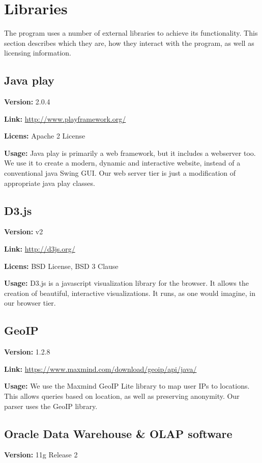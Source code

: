 \section{Libraries}

The program uses a number of external libraries to achieve its functionality. This section describes which they are,
how they interact with the program, as well as licensing information. 

\subsection{Java play}
\textbf{Version:} 2.0.4

\textbf{Link:} \url{http://www.playframework.org/}

\textbf{Licens:} Apache 2 License

\textbf{Usage:} 
Java play is primarily a web framework, but it includes a webserver too.
We use it to create a modern, dynamic and interactive website, instead of a conventional java Swing GUI.
Our web server tier is just a modification of appropriate java play classes.

\subsection{D3.js}
\textbf{Version:} v2

\textbf{Link:} \url{http://d3js.org/} 

\textbf{Licens:} BSD License, BSD 3 Clause


\textbf{Usage:} 
D3.js is a javascript visualization library for the browser.
It allows the creation of beautiful, interactive visualizations.
It runs, as one would imagine, in our browser tier.


\subsection{GeoIP}\label{geo}

\textbf{Version:} 1.2.8

\textbf{Link:} \url{https://www.maxmind.com/download/geoip/api/java/}

\textbf{Usage:} 
We use the Maxmind GeoIP Lite library to map user IPs to locations.
This allows queries based on location, as well as preserving anonymity.
Our parser uses the GeoIP library.


\subsection{Oracle Data Warehouse \& OLAP software}
\textbf{Version:} 11g Release 2

